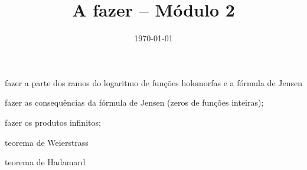 \documentclass[12pt,a4paper]{article}
\title{A fazer -- Módulo 2}
\author{}
\date{\today}
\newcommand{\cmark}{\ding{51}}%
\newcommand{\done}{\rlap{$\square$}{\raisebox{2pt}{\large\hspace{1pt}\cmark}}%
\hspace{-2.5pt}}
\begin{document}
\maketitle

\begin{todolist}
    \item[\done] fazer a parte dos ramos do logaritmo de funções holomorfas
    e a fórmula de Jensen
    \item[\done] fazer as consequências da fórmula de Jensen (zeros de funções inteiras);
    \item[\done] fazer os produtos infinitos;
    \item[\done] teorema de Weierstrass
    \item teorema de Hadamard

\end{todolist}
\end{document}
